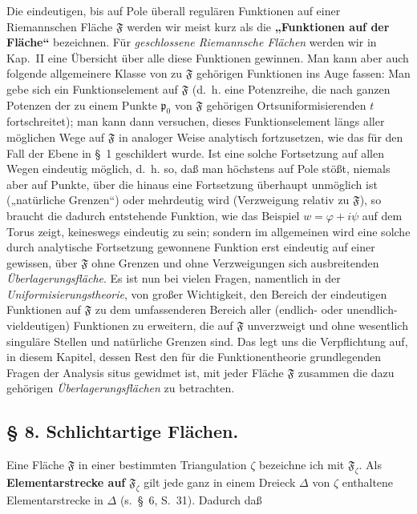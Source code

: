 \documentclass{article}
\begin{document}
Die eindeutigen, bis auf Pole überall regulären Funktionen auf einer Riemannschen Fläche $\mathfrak{F}$ werden wir meist kurz als die \textbf{„Funktionen auf der Fläche“} bezeichnen. Für \emph{geschlossene Riemannsche Flächen} werden wir in Kap.~II eine Übersicht über alle diese Funktionen gewinnen. Man kann aber auch folgende allgemeinere Klasse von zu $\mathfrak{F}$ gehörigen Funktionen ins Auge fassen: Man gebe sich ein Funktionselement auf $\mathfrak{F}$ (d.~h. eine Potenzreihe, die nach ganzen Potenzen der zu einem Punkte $\mathfrak{p}_0$ von $\mathfrak{F}$ gehörigen Ortsuniformisierenden $t$ fortschreitet); man kann dann versuchen, dieses Funktionselement längs aller möglichen Wege auf $\mathfrak{F}$ in analoger Weise analytisch fortzusetzen, wie das für den Fall der Ebene in §~1 geschildert wurde. Ist eine solche Fortsetzung auf allen Wegen eindeutig möglich, d.~h. so, daß man höchstens auf Pole stößt, niemals aber auf Punkte, über die hinaus eine Fortsetzung überhaupt unmöglich ist („natürliche Grenzen“) oder mehrdeutig wird (Verzweigung relativ zu $\mathfrak{F}$), so braucht die dadurch entstehende Funktion, wie das Beispiel $w = \varphi + i\psi$ auf dem Torus zeigt, keineswegs eindeutig zu sein; sondern im allgemeinen wird eine solche durch analytische Fortsetzung gewonnene Funktion erst eindeutig auf einer gewissen, über $\mathfrak{F}$ ohne Grenzen und ohne Verzweigungen sich ausbreitenden \emph{Überlagerungsfläche}. Es ist nun bei vielen Fragen, namentlich in der \emph{Uniformisierungstheorie}, von großer Wichtigkeit, den Bereich der eindeutigen Funktionen auf $\mathfrak{F}$ zu dem umfassenderen Bereich aller (endlich- oder unendlich-vieldeutigen) Funktionen zu erweitern, die auf $\mathfrak{F}$ unverzweigt und ohne wesentlich singuläre Stellen und natürliche Grenzen sind. Das legt uns die Verpflichtung auf, in diesem Kapitel, dessen Rest den für die Funktionentheorie grundlegenden Fragen der Analysis situs gewidmet ist, mit jeder Fläche $\mathfrak{F}$ zusammen die dazu gehörigen \emph{Überlagerungsflächen} zu betrachten.

\subsection*{§ 8. Schlichtartige Flächen.}

Eine Fläche $\mathfrak{F}$ in einer bestimmten Triangulation $\zeta$ bezeichne ich mit $\mathfrak{F}_\zeta$. Als \textbf{Elementarstrecke auf} $\mathfrak{F}_\zeta$ gilt jede ganz in einem Dreieck $\Delta$ von $\zeta$ enthaltene Elementarstrecke in $\Delta$ (s.~§~6, S.~31). Dadurch daß
\end{document}
